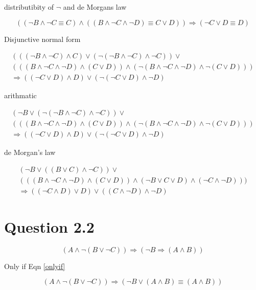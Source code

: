 \documentclass[10pt,a4paper]{article}
\begin{document}
distributibity of $\neg$ and de Morgans law

\begin{equation}
 ((\neg B\wedge \neg C \equiv C)\wedge((B\wedge \neg C\wedge \neg D) \equiv C \vee D)) \Rightarrow (\neg C \vee D \equiv D)
\end{equation}

Disjunctive normal form

\begin{multline}
 (((\neg B \wedge \neg C)\wedge C)\vee(\neg(\neg B \wedge \neg C)\wedge\neg C))\vee \\
 (((B \wedge \neg C \wedge \neg D)\wedge (C\vee D))\wedge (\neg(B\wedge\neg C\wedge\neg D)\wedge\neg(C\vee D)))  \\ \Rightarrow((\neg C \vee D)\wedge D)\vee(\neg(\neg C\vee D)\wedge\neg D) 
\end{multline}

arithmatic

\begin{multline}
 (\neg B\vee(\neg(\neg B \wedge \neg C)\wedge\neg C))\vee \\
 (((B \wedge \neg C \wedge \neg D)\wedge (C\vee D))\wedge (\neg(B\wedge\neg C\wedge\neg D)\wedge\neg(C\vee D)))  \\ \Rightarrow((\neg C \vee D)\wedge D)\vee(\neg(\neg C\vee D)\wedge\neg D) 
\end{multline}

de Morgan's law

\begin{multline}
 (\neg B\vee(( B \vee C)\wedge\neg C))\vee \\
 (((B \wedge \neg C \wedge \neg D)\wedge (C\vee D))\wedge (\neg B\vee C\vee D)\wedge(\neg C\wedge\neg D)))  \\ \Rightarrow((\neg C \wedge D)\vee D)\vee((C\wedge \neg D)\wedge\neg D) 
\end{multline}



\section{Question 2.2}

\begin{equation}
 (A \wedge \neg(B\vee \neg C)) \Rightarrow (\neg B \Rightarrow (A\wedge B))
\end{equation}

Only if Eqn \ref{onlyif}

\begin{equation}
 (A \wedge \neg(B\vee \neg C)) \Rightarrow (\neg B \vee (A\wedge B)\equiv (A\wedge B))
\end{equation}
\end{document}
